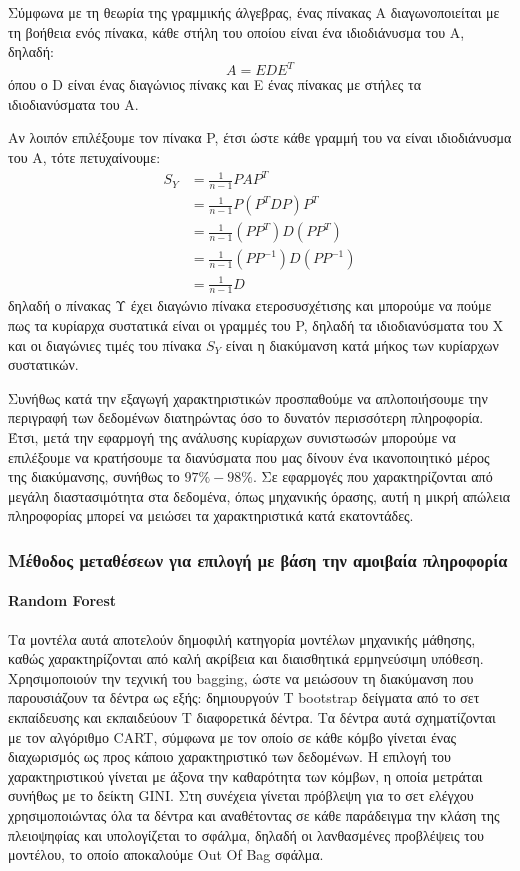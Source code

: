 \documentclass{article}
\begin{document}
Σύμφωνα με τη θεωρία της γραμμικής άλγεβρας, ένας πίνακας Α διαγωνοποιείται  με τη βοήθεια ενός πίνακα, κάθε στήλη του οποίου είναι ένα ιδιοδιάνυσμα του Α, δηλαδή:
$$A=EDE^T$$
όπου ο D είναι ένας διαγώνιος πίνακς και Ε ένας πίνακας με στήλες τα ιδιοδιανύσματα του Α. 

Αν λοιπόν επιλέξουμε τον πίνακα P, έτσι ώστε κάθε γραμμή του να είναι ιδιοδιάνυσμα του A, τότε πετυχαίνουμε:
\begin{equation*} 
\begin{split}
S_Y & = \frac{1}{n-1} PAP^T \\
 & = \frac{1}{n-1} P(P^TDP)P^T \\
  & = \frac{1}{n-1} (PP^T)D(PP^T)\\
   & = \frac{1}{n-1}(PP^{-1})D(PP^{-1})\\
    & = \frac{1}{n-1} D
\end{split}
\end{equation*} 
δηλαδή ο πίνακας Υ έχει διαγώνιο πίνακα ετεροσυσχέτισης και μπορούμε να πούμε πως τα κυρίαρχα συστατικά είναι οι γραμμές του P, δηλαδή τα ιδιοδιανύσματα του X και οι διαγώνιες τιμές του πίνακα $S_Y$ είναι η διακύμανση κατά μήκος των κυρίαρχων συστατικών.

Συνήθως κατά την εξαγωγή χαρακτηριστικών προσπαθούμε να απλοποιήσουμε την περιγραφή των δεδομένων διατηρώντας όσο το δυνατόν περισσότερη πληροφορία. Έτσι, μετά την εφαρμογή της ανάλυσης κυρίαρχων συνιστωσών μπορούμε να επιλέξουμε να κρατήσουμε τα διανύσματα που μας δίνουν ένα ικανοποιητικό μέρος της διακύμανσης, συνήθως το $ 97\% -98\% $. Σε εφαρμογές που χαρακτηρίζονται από μεγάλη διαστασιμότητα στα δεδομένα, όπως μηχανικής όρασης, αυτή η μικρή απώλεια πληροφορίας μπορεί να μειώσει τα χαρακτηριστικά κατά εκατοντάδες.

\subsubsection{Μέθοδος μεταθέσεων για επιλογή με βάση την αμοιβαία πληροφορία}
\paragraph{Random Forest} Τα μοντέλα αυτά αποτελούν δημοφιλή κατηγορία μοντέλων μηχανικής μάθησης, καθώς χαρακτηρίζονται από καλή ακρίβεια και διαισθητικά ερμηνεύσιμη υπόθεση. Χρησιμοποιούν την τεχνική του bagging, ώστε να μειώσουν τη διακύμανση που παρουσιάζουν τα δέντρα ως εξής: δημιουργούν Τ bootstrap δείγματα από το σετ εκπαίδευσης και εκπαιδεύουν Τ διαφορετικά δέντρα. Τα δέντρα αυτά σχηματίζονται με τον αλγόριθμο CART, σύμφωνα με τον οποίο σε κάθε κόμβο γίνεται ένας διαχωρισμός ως προς κάποιο χαρακτηριστικό των δεδομένων. Η επιλογή του χαρακτηριστικού γίνεται με άξονα την καθαρότητα των κόμβων, η οποία μετράται συνήθως με το δείκτη GINI. Στη συνέχεια γίνεται πρόβλεψη για το σετ ελέγχου χρησιμοποιώντας όλα τα δέντρα και αναθέτοντας σε κάθε παράδειγμα την κλάση της πλειοψηφίας και υπολογίζεται το σφάλμα, δηλαδή οι λανθασμένες προβλέψεις του μοντέλου, το οποίο αποκαλούμε Out Of Bag σφάλμα.
\end{document}
